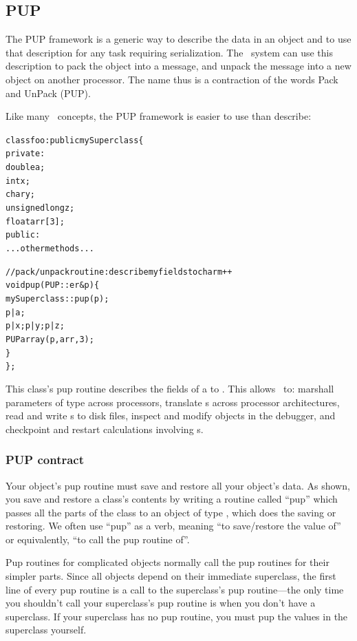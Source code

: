 \subsection{PUP}

\label{sec:pup}

The  PUP framework is a generic way to describe the data in an object and to use that description for any task requiring serialization.
The \charmpp\ system can use this description to pack the object 
into a message, and unpack the message into a new object on another 
processor. 
The name thus is a contraction of the words Pack and UnPack (PUP). 

Like many \CC\ concepts, the PUP framework is easier to use than 
describe: 

\begin{alltt}
class foo : public mySuperclass \{
 private:
    double a;
    int x;
    char y;
    unsigned long z;
    float arr[3];
 public:
    ...other methods...

    //pack/unpack routine: describe my fields to charm++
    void pup(PUP::er &p) \{
      mySuperclass::pup(p);
      p|a;
      p|x; p|y; p|z;
      PUParray(p,arr,3);
    \}
\};
\end{alltt}

This class's pup routine describes the fields of a  to \charmpp{}.
This allows \charmpp\ to: marshall parameters of type  across processors,
translate s across processor architectures, read and write s
to disk files, inspect and modify  objects in the debugger, and 
checkpoint and restart calculations involving s.



\subsubsection{PUP contract}

Your object's pup routine must save and restore all your object's data.
As shown, you save and restore a class's contents by writing a routine
called ``pup'' which passes all the parts of the class to an object of type
 , which does the saving or restoring.  
We often use ``pup'' as a verb, meaning ``to save/restore the value of''
or equivalently, ``to call the pup routine of''.

Pup routines for complicated objects normally call the pup routines
for their simpler parts.  Since all objects depend on their immediate
superclass, the first line of every pup routine is a call to the 
superclass's pup routine---the only time you shouldn't call your superclass's
pup routine is when you don't have a superclass.  If your superclass has
no pup routine, you must pup the values in the superclass yourself.


